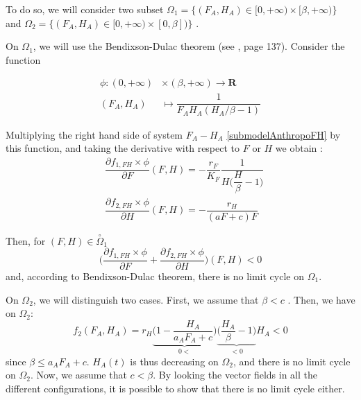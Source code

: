 \documentclass{article}
\begin{document}
To do so, we will consider two subset $\Omega_1 = \{(F_A,H_A) \in [0, +\infty) \times [\beta, +\infty)\}$ and $\Omega_2 = \{(F_A,H_A) \in [0, +\infty) \times [0, \beta])\}$ . 


On $\Omega_1$, we will use the Bendixson-Dulac theorem (see \cite{farkas_1994_periodic}, page 137). Consider the function

\begin{align}
\phi : (0, +\infty) &\times (\beta, +\infty) \rightarrow \mathbf{R} \label{limit cylce:phiFH}
\\
\nonumber
(F_A,H_A) & \mapsto \dfrac{1}{F_A H_A (H_A/\beta - 1)}
\end{align}

Multiplying the right hand side of system $F_A-H_A$ \eqref{submodelAnthropoFH} by this function, and taking the derivative with respect to $F$ or $H$ we obtain :
\begin{subequations}
\begin{align}
&\dfrac{\partial f_{1,FH} \times \phi}{\partial F}(F,H) = - \dfrac{r_F}{K_F} \dfrac{1}{H \big(\dfrac{H}{\beta}-1 \big)} \\
&\dfrac{\partial f_{2,FH} \times \phi}{\partial H}(F,H) = - \dfrac{r_H}{(aF + c) F}
\end{align}
\end{subequations}

Then, for $(F, H) \in \overset{\circ}{\Omega}_1$
\begin{equation}
\Big(\dfrac{\partial f_{1,FH} \times \phi}{\partial F} + \dfrac{\partial f_{2,FH} \times \phi}{\partial H}\Big) (F, H) < 0
\end{equation}
and, according to Bendixson-Dulac theorem, there is no limit cycle on $\Omega_1$.

On $\Omega_2$, we will distinguish two cases. First, we assume that $\beta < c$ . Then, we have on $\Omega_2$:
\begin{equation}
f_{2}(F_A,H_A) = r_H \underset{0<}{\underbrace{\Big(1 - \dfrac{H_A}{a_AF_A + c} \Big)}}\underset{<0}{\underbrace{\Big(\dfrac{H_A}{\beta} -1\Big)}} H_A < 0
\end{equation}
since $\beta \leq a_AF_A + c$. $H_A(t)$ is thus decreasing on $\Omega_2$, and there is no limit cycle on $\Omega_2$.
Now, we assume that $c < \beta$. By looking the vector fields in all the different configurations, it is possible to show that there is no limit cycle either.

\newpage
\end{document}
